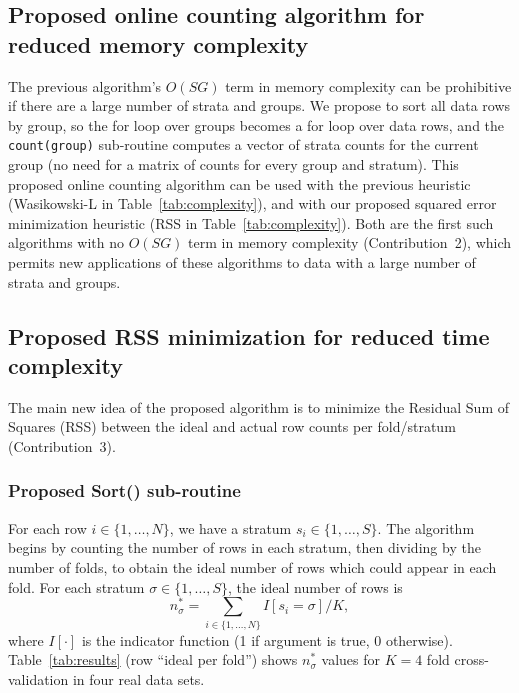 \documentclass[twoside]{article}
\begin{document}
\subsection{Proposed online counting algorithm for reduced memory complexity}
\label{sec:online}
The previous algorithm’s $O(SG)$ term in memory complexity can be prohibitive if there are a large number of strata and groups.
We propose to sort all data rows by group, so the for loop over groups becomes a for loop over data rows, and the \texttt{count(group)} sub-routine computes a vector of strata counts for the current group (no need for a matrix of counts for every group and stratum).
This proposed online counting algorithm can be used with the previous heuristic (Wasikowski-L in Table~\ref{tab:complexity}), and with our proposed squared error minimization heuristic (RSS in Table~\ref{tab:complexity}).
Both are the first such algorithms with no $O(SG)$ term in memory complexity (Contribution~2), which permits new applications of these algorithms to data with a large number of strata and groups.
\subsection{Proposed RSS minimization for reduced time complexity}
\label{sec:RSS-algo}
The main new idea of the proposed algorithm is to minimize the Residual Sum of Squares (RSS) between the ideal and actual row counts per fold/stratum (Contribution~3).
\subsubsection{Proposed Sort() sub-routine}
\label{sec:proposed-sort}
For each row $i\in\{1,\dots,N\}$, we have a stratum $s_i\in\{1,\dots,S\}$.
The algorithm begins by counting the number of rows in each stratum, then dividing by the number of folds, to obtain the ideal number of rows which could appear in each fold.
For each stratum $\sigma\in\{1,\dots,S\}$, the ideal number of rows is
\begin{equation}
n^*_\sigma = \sum_{i\in\{1,\dots,N\}}
I[s_i = \sigma]/K,
\end{equation}
where $I[\cdot]$ is the indicator function (1 if argument is true, 0 otherwise).
Table~\ref{tab:results} (row ``ideal per fold'') shows $n^*_\sigma$ values for $K=4$ fold cross-validation in four real data sets.
\end{document}
